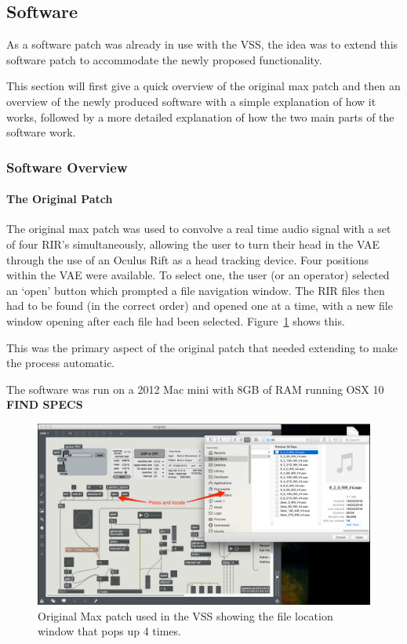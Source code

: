 \documentclass[../../main.tex]{subfiles}
\begin{document}
\lstset{language=Java} 
	\subsection{Software}
	\label{software}
		
		As a software patch was already in use with the \ac{VSS}, the idea was to extend this software patch to accommodate the newly proposed functionality.

		This section will first give a quick overview of the original max patch and then an overview of the newly produced software with a simple explanation of how it works, followed by a more detailed explanation of how the two main parts of the software work.

		\subsubsection{Software Overview}

			\paragraph{The Original Patch}
			\label{softwareoverview:original}
				The original max patch was used to convolve a real time audio signal with a set of four \ac{RIR}'s simultaneously, allowing the user to turn their head in the \ac{VAE} through the use of an Oculus Rift as a head tracking device. Four positions within the \ac{VAE} were available. To select one, the user (or an operator) selected an `open' button which prompted a file navigation window. The \ac{RIR} files then had to be found (in the correct order) and opened one at a time, with a new file window opening after each file had been selected. Figure~\ref{original} shows this.

				This was the primary aspect of the original patch that needed extending to make the process automatic.

				The software was run on a 2012 Mac mini with 8GB of RAM running OSX 10 \textbf{FIND SPECS}

				\begin{figure}[H]
					\centerline{\includegraphics[scale = 0.4]{Sections/Implementation/Max/images/Max/OriginalPatch_Edit.png}}
					\caption{Original Max patch used in the \ac{VSS} showing the file location window that pops up 4 times.}
					\label{original}
				\end{figure}
\end{document}

